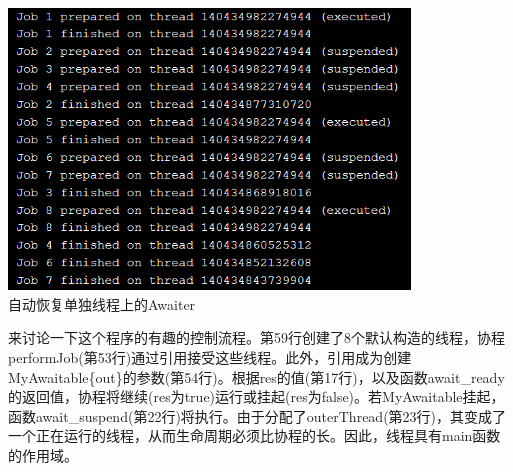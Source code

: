 \begin{center}
\includegraphics[width=0.8\textwidth]{content/3/chapter7/images/21.png}\\
自动恢复单独线程上的Awaiter
\end{center}

来讨论一下这个程序的有趣的控制流程。第59行创建了8个默认构造的线程，协程performJob(第53行)通过引用接受这些线程。此外，引用成为创建MyAwaitable\{out\}的参数(第54行)。根据res的值(第17行)，以及函数await\_ready的返回值，协程将继续(res为true)运行或挂起(res为false)。若MyAwaitable挂起，函数await\_suspend(第22行)将执行。由于分配了outerThread(第23行)，其变成了一个正在运行的线程，从而生命周期必须比协程的长。因此，线程具有main函数的作用域。

